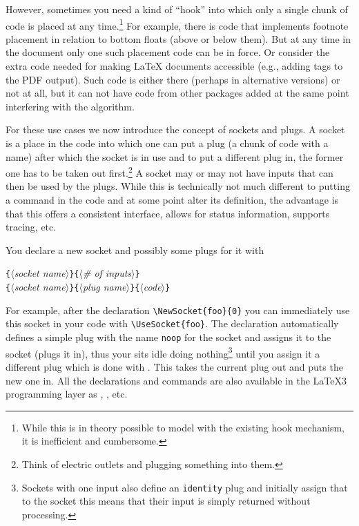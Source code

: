 \documentclass{ltnews}
\providecommand\Dash {\unskip \textemdash}
\providecommand\meta[1]{$\langle$\textrm{\itshape#1}$\rangle$}
\providecommand\Arg[1]{\texttt\{\meta{#1}\texttt\}}
\begin{document}
However, sometimes you need a kind of \enquote{hook} into which only a
single chunk of code is placed at any time.\footnote{While this is in
theory possible to model with the existing hook mechanism, it is
inefficient and cumbersome.}  For example, there is code that
implements footnote placement in relation to bottom floats (above or
below them). But at any time in the document only one such placement
code can be in force. Or consider the extra code needed for making
\LaTeX{} documents accessible (e.g., adding tags to the PDF
output). Such code is either there (perhaps in alternative versions)
or not at all, but it can not have code from other packages added at
the same point interfering with the algorithm.

For these use cases we now introduce the concept of sockets and plugs.
A socket is a place in the code into which one can put a plug (a
chunk of code with a name) after which the socket is in use and to put
a different plug in, the former one has to be taken out
first.\footnote{Think of electric outlets and plugging something into
them.} A socket may or may not have inputs that can then be used by
the plugs.
%
While this is technically not much different to putting a command in
the code and at some point alter its definition, the advantage is that
this offers a consistent interface, allows for status information,
supports tracing, etc.

You declare a new socket and possibly some plugs for it with
\begin{flushleft}
  \Arg{socket name}\Arg{\# of inputs} \\
  \Arg{socket name}\Arg{plug name}\Arg{code}
\end{flushleft}
For example, after the declaration \verb=\NewSocket{foo}{0}= you can
immediately use this socket in your code with \verb=\UseSocket{foo}=.
The  declaration automatically defines a simple plug
with the name \texttt{noop} for the socket and assigns it to the socket
(plugs it in), thus your  sits idle doing
nothing\footnote{Sockets with one input also define an
\texttt{identity} plug and initially assign that to the socket\Dash
this means that their input is simply returned without processing.}
until you assign it a different plug which is done with
. This takes the current plug out and puts the
new one in.
%
All the declarations and commands are also available in the \LaTeX3
programming layer as , ,
etc.
\end{document}
